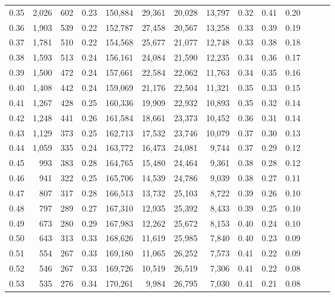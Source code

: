 \begin{tabular}{rrrrrrrrrrrrrr}
0.35 &  2,026 &  602 &  0.23 &  150,884 &   29,361 &  20,028 &  13,797 &  0.32 &  0.41 &      0.20 \\
0.36 &  1,903 &  539 &  0.22 &  152,787 &   27,458 &  20,567 &  13,258 &  0.33 &  0.39 &      0.19 \\
0.37 &  1,781 &  510 &  0.22 &  154,568 &   25,677 &  21,077 &  12,748 &  0.33 &  0.38 &      0.18 \\
0.38 &  1,593 &  513 &  0.24 &  156,161 &   24,084 &  21,590 &  12,235 &  0.34 &  0.36 &      0.17 \\
0.39 &  1,500 &  472 &  0.24 &  157,661 &   22,584 &  22,062 &  11,763 &  0.34 &  0.35 &      0.16 \\
0.40 &  1,408 &  442 &  0.24 &  159,069 &   21,176 &  22,504 &  11,321 &  0.35 &  0.33 &      0.15 \\
0.41 &  1,267 &  428 &  0.25 &  160,336 &   19,909 &  22,932 &  10,893 &  0.35 &  0.32 &      0.14 \\
0.42 &  1,248 &  441 &  0.26 &  161,584 &   18,661 &  23,373 &  10,452 &  0.36 &  0.31 &      0.14 \\
0.43 &  1,129 &  373 &  0.25 &  162,713 &   17,532 &  23,746 &  10,079 &  0.37 &  0.30 &      0.13 \\
0.44 &  1,059 &  335 &  0.24 &  163,772 &   16,473 &  24,081 &   9,744 &  0.37 &  0.29 &      0.12 \\
0.45 &    993 &  383 &  0.28 &  164,765 &   15,480 &  24,464 &   9,361 &  0.38 &  0.28 &      0.12 \\
0.46 &    941 &  322 &  0.25 &  165,706 &   14,539 &  24,786 &   9,039 &  0.38 &  0.27 &      0.11 \\
0.47 &    807 &  317 &  0.28 &  166,513 &   13,732 &  25,103 &   8,722 &  0.39 &  0.26 &      0.10 \\
0.48 &    797 &  289 &  0.27 &  167,310 &   12,935 &  25,392 &   8,433 &  0.39 &  0.25 &      0.10 \\
0.49 &    673 &  280 &  0.29 &  167,983 &   12,262 &  25,672 &   8,153 &  0.40 &  0.24 &      0.10 \\
0.50 &    643 &  313 &  0.33 &  168,626 &   11,619 &  25,985 &   7,840 &  0.40 &  0.23 &      0.09 \\
0.51 &    554 &  267 &  0.33 &  169,180 &   11,065 &  26,252 &   7,573 &  0.41 &  0.22 &      0.09 \\
0.52 &    546 &  267 &  0.33 &  169,726 &   10,519 &  26,519 &   7,306 &  0.41 &  0.22 &      0.08 \\
0.53 &    535 &  276 &  0.34 &  170,261 &    9,984 &  26,795 &   7,030 &  0.41 &  0.21 &      0.08 \\

\end{tabular}
